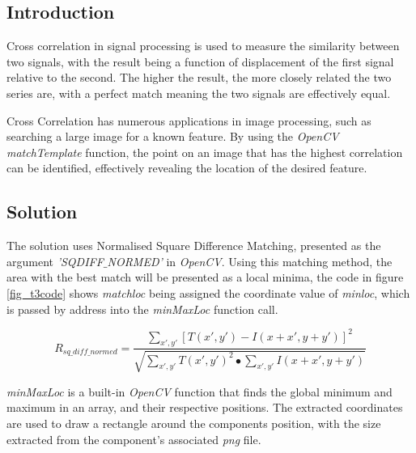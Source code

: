 \documentclass[conference]{IEEEtran}
\begin{document}
\subsection{Introduction}
Cross correlation in signal processing is used to measure the similarity between two signals, with the result being a function of displacement of the first signal relative to the second. The higher the result, the more closely related the two series are, with a perfect match meaning the two signals are effectively equal\cite{ControlStation}. 

Cross Correlation has numerous applications in image processing, such as searching a large image for a known feature. By using the \textit{OpenCV} \textit{matchTemplate} function, the point on an image that has the highest correlation can be identified, effectively revealing the location of the desired feature. 
\subsection{Solution}
The solution uses Normalised Square Difference Matching, presented as the argument \textit{'SQDIFF$\_$NORMED'} in \textit{OpenCV}. Using this matching method, the area with the best match will be presented as a local minima\cite{LearningOpenCV}, the code in figure \ref{fig_t3code} shows \textit{matchloc} being assigned the coordinate value of \textit{minloc}, which is passed by address into the \textit{minMaxLoc} function call.

\begin{equation}
R_{sq\_diff\_normed} = \frac{\sum_{x',y'}^{}[T(x',y')-I(x+x',y+y')]^2}{\sqrt{\sum_{x',y'}^{}T(x',y')^2 \bullet\sum_{x',y'}^{}I(x+x',y+y')}}
\end{equation}\label{eq:sq_diff}

\textit{minMaxLoc} is a built-in \textit{OpenCV} function that finds the global minimum and maximum in an array, and their respective positions\cite{OpenCV_minMaxLoc}. The extracted coordinates are used to draw a rectangle around the components position, with the size extracted from the component's associated \textit{png} file.
\end{document}
